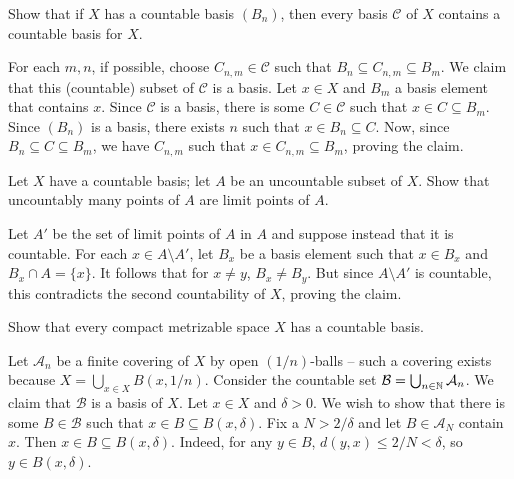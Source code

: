 	\begin{exercise}
		Show that if $X$ has a countable basis $(B_n)$, then every basis $\mathcal{C}$ of $X$ contains a countable basis for $X$.
	\end{exercise}
	\begin{solution*}
		For each $m,n$, if possible, choose $C_{n,m}\in\mathcal{C}$ such that $B_n\subseteq C_{n,m}\subseteq B_m$. We claim that this (countable) subset of $\mathcal{C}$ is a basis. Let $x\in X$ and $B_m$ a basis element that contains $x$. Since $\mathcal{C}$ is a basis, there is some $C\in\mathcal{C}$ such that $x\in C\subseteq B_m$. Since $(B_n)$ is a basis, there exists $n$ such that $x\in B_n\subseteq C$. Now, since $B_n\subseteq C\subseteq B_m$, we have $C_{n,m}$ such that $x\in C_{n,m} \subseteq B_m$, proving the claim.
	\end{solution*}

	\begin{exercise}
		Let $X$ have a countable basis; let $A$ be an uncountable subset of $X$. Show that uncountably many points of $A$ are limit points of $A$.
	\end{exercise}
	\begin{solution*}
		Let $A'$ be the set of limit points of $A$ in $A$ and suppose instead that it is countable. For each $x\in A\setminus A'$, let $B_x$ be a basis element such that $x\in B_x$ and $B_x\cap A = \{x\}$. It follows that for $x\neq y$, $B_x\neq B_y$. But since $A\setminus A'$ is countable, this contradicts the second countability of $X$, proving the claim.
	\end{solution*}

	\begin{exercise}
		Show that every compact metrizable space $X$ has a countable basis.
	\end{exercise}
	\begin{solution*}
		Let $\mathcal{A}_n$ be a finite covering of $X$ by open $(1/n)$-balls -- such a covering exists because $X = \bigcup_{x\in X} B(x,1/n)$. Consider the countable set $\mathcal{B} = \bigcup_{n\in\mathbb{N}} \mathcal{A}_n$. We claim that $\mathcal{B}$ is a basis of $X$. Let $x\in X$ and $\delta>0$. We wish to show that there is some $B\in\mathcal{B}$ such that $x\in B\subseteq B(x,\delta)$. Fix a $N > 2/\delta$ and let $B \in \mathcal{A}_N$ contain $x$. Then $x \in B \subseteq B(x,\delta)$. Indeed, for any $y\in B$, $d(y,x) \leq 2/N < \delta$, so $y\in B(x,\delta)$.
	\end{solution*}

